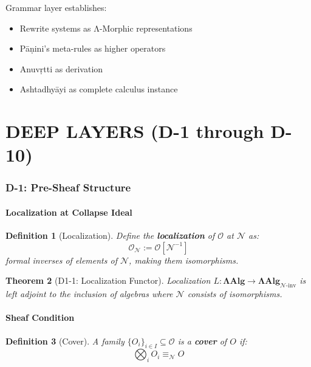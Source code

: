 \documentclass[12pt, oneside]{article}
\newtheorem{theorem}{Theorem}[section]
\newtheorem{definition}[theorem]{Definition}
\newcommand{\N}{\mathcal{N}}
\newcommand{\Opr}{\mathcal{O}}
\begin{document}
Grammar layer establishes:
\begin{itemize}
    \item Rewrite systems as Λ-Morphic representations
    \item Pāṇini's meta-rules as higher operators
    \item Anuvṛtti as derivation
    \item Ashtadhyāyi as complete calculus instance
\end{itemize}

\newpage

\part{DEEP LAYERS (D-1 through D-10)}

\section{D-1: Pre-Sheaf Structure}

\subsection{Localization at Collapse Ideal}

\begin{definition}[Localization]
Define the \textbf{localization} of $\Opr$ at $\N$ as:
\begin{equation}
\Opr_\N := \Opr[\N^{-1}]
\end{equation}
formal inverses of elements of $\N$, making them isomorphisms.
\end{definition}

\begin{theorem}[D1-1: Localization Functor]
Localization $L: \mathbf{ΛAlg} \rightarrow \mathbf{ΛAlg}_{\N\text{-inv}}$ is left adjoint to the inclusion of algebras where $\N$ consists of isomorphisms.
\end{theorem}

\subsection{Sheaf Condition}

\begin{definition}[Cover]
A family $\{O_i\}_{i \in I} \subseteq \Opr$ is a \textbf{cover} of $O$ if:
\begin{equation}
\bigotimes_i O_i \equiv_\N O
\end{equation}
\end{definition}
\end{document}
